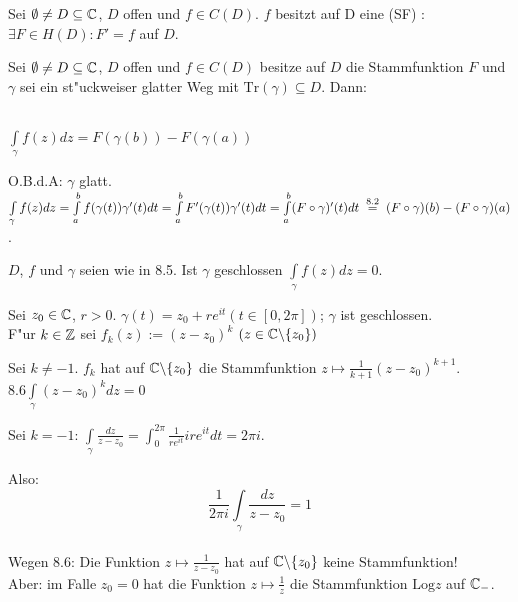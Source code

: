 \documentclass[a4paper,twoside,DIV15,BCOR12mm]{scrbook}
\def\gdw{\equizu}
\def\Log{\text{Log}}
\def\Tr{\text{Tr}}
\def\wegint{\ensuremath{\int\limits_\gamma}}
\def\gdw{\equizu}
\def\iint{\ensuremath{\int\limits}}
\begin{document}
\begin{definition}
Sei $\emptyset \neq D \subseteq \mathbb{C}$, $D$ offen und $f\in C(D)$. $f$ besitzt auf D eine  (SF) :\gdw $\exists F\in H(D):F'=f$ auf $D$.
\end{definition}

\begin{samepage}\begin{satz}
Sei $\emptyset \neq D \subseteq \mathbb{C}$, $D$ offen und $f\in C(D)$ besitze auf $D$ die Stammfunktion $F$ und $\gamma$ sei ein st"uckweiser glatter Weg mit $\Tr(\gamma)\subseteq D$. Dann:\\
\\ \centerline{$\wegint f(z)dz = F(\gamma(b))-F(\gamma(a))$}
\end{satz}\end{samepage}

\begin{beweis}
O.B.d.A: $\gamma$ glatt. $\wegint f(z)dz = \iint_a^bf(\gamma(t))\gamma'(t)dt=\iint_a^b F'(\gamma(t))\gamma'(t)dt=\iint_a^b(F\circ \gamma)'(t)dt \gleichnach{8.2} (F \circ \gamma)(b) - (F\circ \gamma)(a)$.
\end{beweis}

\begin{folgerung}
 $D$, $f$ und $\gamma$ seien wie in 8.5. Ist $\gamma$ geschlossen \folgt $\wegint f(z)dz = 0$.
\end{folgerung}

\begin{wichtigesbeispiel}
Sei $z_0 \in \mathbb{C}$, $r>0$. $\gamma(t)=z_0+re^{it} (t\in[0,2\pi])$; $\gamma$ ist geschlossen. \\
F"ur $k\in\mathbb{Z}$ sei $f_k(z):=(z-z_0)^k $ $(z\in\mathbb{C} \backslash \{z_0\})$\\
\begin{liste}
   \item Sei $k\neq -1$. $f_k$ hat auf $\mathbb{C} \backslash \{z_0\}$ die Stammfunktion $z\mapsto \frac{1}{k+1}(z-z_0)^{k+1}$.\\
     8.6\folgt $\wegint(z-z_0)^kdz=0$
   \item Sei $k=-1$: $\wegint \frac{dz}{z-z_0} = \iint_0^{2\pi} \frac1{re^{it}}ire^{it}dt = 2\pi i$.
\end{liste}
Also: 
$$\frac1{2\pi i} \wegint \frac{dz}{z-z_0} = 1$$ \\ 
Wegen 8.6: Die Funktion $z\mapsto\frac1{z-z_0}$ hat auf $\mathbb{C} \backslash \{z_0\}$ keine Stammfunktion!\\
Aber:  im Falle $z_0=0$ hat die Funktion $z \mapsto \frac1z$ die Stammfunktion $\Log z$ auf $\mathbb{C}_-$.
\end{wichtigesbeispiel}
\end{document}
